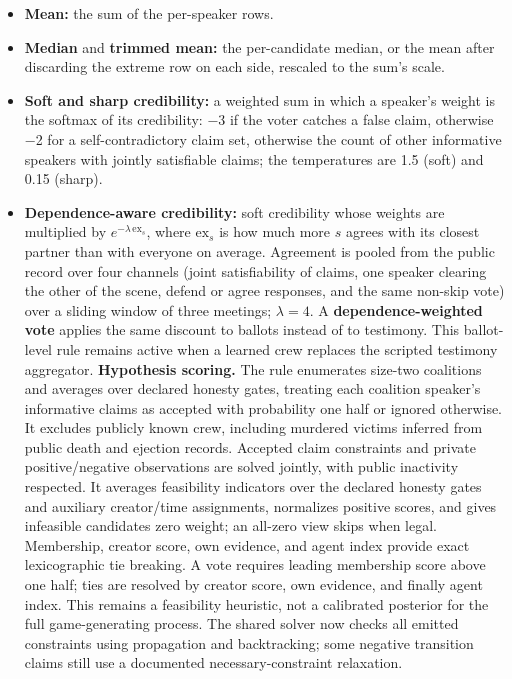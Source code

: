 \documentclass[
  12pt,
]{article}
\providecommand{\tightlist}{%
  \setlength{\itemsep}{0pt}\setlength{\parskip}{0pt}}
\begin{document}
\begin{itemize}
\tightlist
\item
  \textbf{Mean:} the sum of the per-speaker rows.
\item
  \textbf{Median} and \textbf{trimmed mean:} the per-candidate median,
  or the mean after discarding the extreme row on each side, rescaled to
  the sum's scale.
\item
  \textbf{Soft and sharp credibility:} a weighted sum in which a
  speaker's weight is the softmax of its credibility: −3 if the voter
  catches a false claim, otherwise −2 for a self-contradictory claim
  set, otherwise the count of other informative speakers with jointly
  satisfiable claims; the temperatures are 1.5 (soft) and 0.15 (sharp).
\item
  \textbf{Dependence-aware credibility:} soft credibility whose weights
  are multiplied by \(e^{-\lambda\,\mathrm{ex}_s}\), where
  \(\mathrm{ex}_s\) is how much more \(s\) agrees with its closest
  partner than with everyone on average. Agreement is pooled from the
  public record over four channels (joint satisfiability of claims, one
  speaker clearing the other of the scene, defend or agree responses,
  and the same non-skip vote) over a sliding window of three meetings;
  \(\lambda = 4\). A \textbf{dependence-weighted vote} applies the same
  discount to ballots instead of to testimony. This ballot-level rule
  remains active when a learned crew replaces the scripted testimony
  aggregator. \textbf{Hypothesis scoring.} The rule enumerates size-two
  coalitions and averages over declared honesty gates, treating each
  coalition speaker's informative claims as accepted with probability
  one half or ignored otherwise. It excludes publicly known crew,
  including murdered victims inferred from public death and ejection
  records. Accepted claim constraints and private positive/negative
  observations are solved jointly, with public inactivity respected. It
  averages feasibility indicators over the declared honesty gates and
  auxiliary creator/time assignments, normalizes positive scores, and
  gives infeasible candidates zero weight; an all-zero view skips when
  legal. Membership, creator score, own evidence, and agent index
  provide exact lexicographic tie breaking. A vote requires leading
  membership score above one half; ties are resolved by creator score,
  own evidence, and finally agent index. This remains a feasibility
  heuristic, not a calibrated posterior for the full game-generating
  process. The shared solver now checks all emitted constraints using
  propagation and backtracking; some negative transition claims still
  use a documented necessary-constraint relaxation.
\end{itemize}
\end{document}
